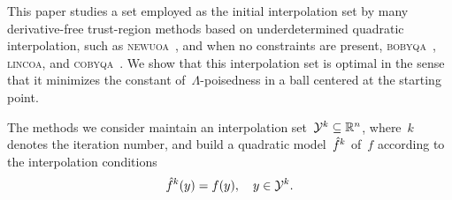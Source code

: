 \documentclass[draft]{article}
\numberwithin{equation}{section}
\theoremstyle{definition}
\theoremstyle{plain}
\theoremstyle{remark}
\newcommand*{\obj}{f}
\newcommand*{\objm}[1][]{\hat{\obj}\ifblank{#1}{}{^{#1}}}
\newcommand*{\R}{\mathbb{R}}
\newcommand*{\solvername}[1]{\textsc{#1}\xspace}
\newcommand*{\xpt}[1][]{\mathcal{Y}\ifblank{#1}{}{^{#1}}}
\begin{document}
This paper studies a set employed as the initial interpolation set by many derivative-free trust-region methods based on underdetermined quadratic interpolation, such as \solvername{newuoa}~\cite{Powell_2006}, and when no constraints are present, \solvername{bobyqa}~\cite{Powell_2009}, \solvername{lincoa}, and \solvername{cobyqa}~\cite{Ragonneau_2022,Ragonneau_Zhang_2023}.
We show that this interpolation set is optimal in the sense that it minimizes the constant of~$\Lambda$-poisedness in a ball centered at the starting point.

%
The methods we consider maintain an interpolation set~$\xpt[k] \subseteq \R^n$, where~$k$ denotes the iteration number, and build a quadratic model~$\objm[k]$ of~$\obj$ according to the interpolation conditions
\begin{equation}
    \label{eq:intp-cond}
    \objm[k](y) = \obj(y), \quad y \in \xpt[k].
\end{equation}
\end{document}
